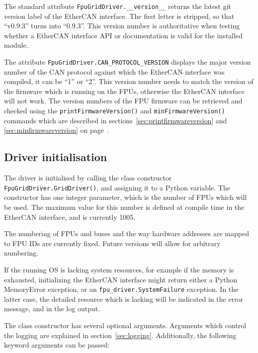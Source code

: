 \documentclass[11pt,a4paper]{scrartcl}
\begin{document}
The standard attribute \texttt{FpuGridDriver.\_\_version\_\_} returns
the latest git version label of the EtherCAN interface. The first letter is stripped, so
that ``v0.9.3'' turns into ``0.9.3''. This version number is
authoritative when testing whether a EtherCAN interface API or documentation is
valid for the installed module.

The attribute \texttt{FpuGridDriver.CAN\_PROTOCOL\_VERSION} displays
the major version number of the CAN protocol against which the EtherCAN interface
was compiled, it can be ``1'' or ``2''. This version number needs to
match the version of the firmware which is running on the FPUs,
otherwise the EtherCAN interface will not work. The version numbers of the FPU
firmware can be retrieved and checked using the
\texttt{printFirmwareVersion()} and \texttt{minFirmwareVersion()}
commands which are described in
sections~\ref{sec:printfirmwareversion} and
\ref{sec:minfirmwareversion} on
page~\pageref{sec:printfirmwareversion}.


\subsection{Driver initialisation}
\label{sec:driverinitialisation}
The driver is initialised by calling the class constructor
\texttt{FpuGridDriver.GridDriver()}, and assigning it to a Python
variable. The constructor has one integer parameter, which is the
number of FPUs which will be used. The maximum value for this number
is defined at compile time in the EtherCAN interface, and is currently 1005.

The numbering of FPUs and buses and the way hardware addresses are
mapped to FPU IDs are currently fixed. Future versions will allow for
arbitrary numbering.

\begin{sloppypar}
If the running OS is lacking system resources, for example if the
memory is exhausted, initializing the EtherCAN interface might return either a
Python MemoryError exception, or an
\texttt{fpu\_driver.SystemFailure} exception. In the latter case,
the detailed resource which is lacking will be indicated in the error
message, and in the log output.
\end{sloppypar}

\label{sec:driverparams}
The class constructor has several optional arguments. Arguments which
control the logging are explained in section~\ref{sec:logging}.
Additionally, the following keyword arguments can
be passed:
\end{document}
